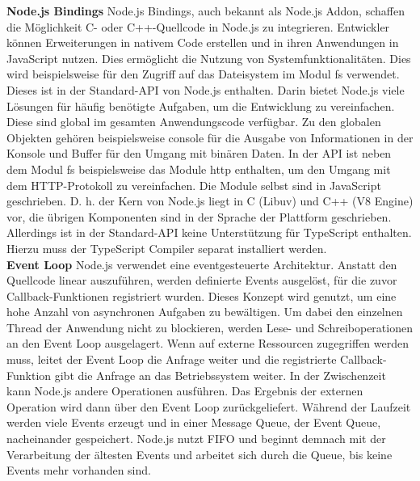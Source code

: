 \noindent
\textbf{Node.js Bindings} \newline
Node.js Bindings, auch bekannt als \glqq Node.js Addon\grqq{}, schaffen die Möglichkeit C- oder C++-Quellcode in Node.js zu integrieren. Entwickler können Erweiterungen in nativem Code erstellen und in ihren Anwendungen in JavaScript nutzen. Dies ermöglicht die Nutzung von Systemfunktionalitäten. Dies wird beispielsweise für den Zugriff auf das Dateisystem im Modul \glqq fs\grqq{} verwendet. Dieses ist in der Standard-API von Node.js enthalten. Darin bietet Node.js viele Lösungen für häufig benötigte Aufgaben, um die Entwicklung zu vereinfachen. Diese sind global im gesamten Anwendungscode verfügbar. Zu den globalen Objekten gehören beispielsweise \glqq console\grqq{} für die Ausgabe von Informationen in der Konsole und \glqq Buffer\grqq{} für den Umgang mit binären Daten. In der API ist neben dem Modul \glqq fs\grqq{} beispielsweise das Module \glqq http\grqq{} enthalten, um den Umgang mit dem HTTP-Protokoll zu vereinfachen. Die Module selbst sind in JavaScript geschrieben. D. h. der Kern von Node.js liegt in C (Libuv) und C++ (V8 Engine)  vor, die übrigen Komponenten sind in der Sprache der Plattform geschrieben. Allerdings ist in der Standard-API keine Unterstützung für TypeScript enthalten. Hierzu muss der TypeScript Compiler separat installiert werden.\cite{OpenJSFoundation.2022b, OpenJSFoundation.o.J.b, Springer.2022}\\

\noindent
\textbf{Event Loop} \newline
Node.js verwendet eine eventgesteuerte Architektur. Anstatt den Quellcode linear auszuführen, werden definierte Events ausgelöst, für die zuvor Callback-Funktionen registriert wurden. Dieses Konzept wird genutzt, um eine hohe Anzahl von asynchronen Aufgaben zu bewältigen. Um dabei den einzelnen Thread der Anwendung nicht zu blockieren, werden Lese- und Schreiboperationen an den Event Loop ausgelagert.  Wenn auf externe Ressourcen zugegriffen werden muss, leitet der Event Loop die Anfrage weiter und die registrierte Callback-Funktion gibt die Anfrage an das Betriebssystem weiter. In der Zwischenzeit kann Node.js andere Operationen ausführen. Das Ergebnis der externen Operation wird dann über den Event Loop zurückgeliefert.\cite{Springer.2022} \newline 
Während der Laufzeit werden viele Events erzeugt und in einer Message Queue, der Event Queue, nacheinander gespeichert. Node.js nutzt FIFO und beginnt demnach mit der Verarbeitung der ältesten Events und arbeitet sich durch die Queue, bis keine Events mehr vorhanden sind.\cite{OpenJSFoundation.o.J.c}\\

